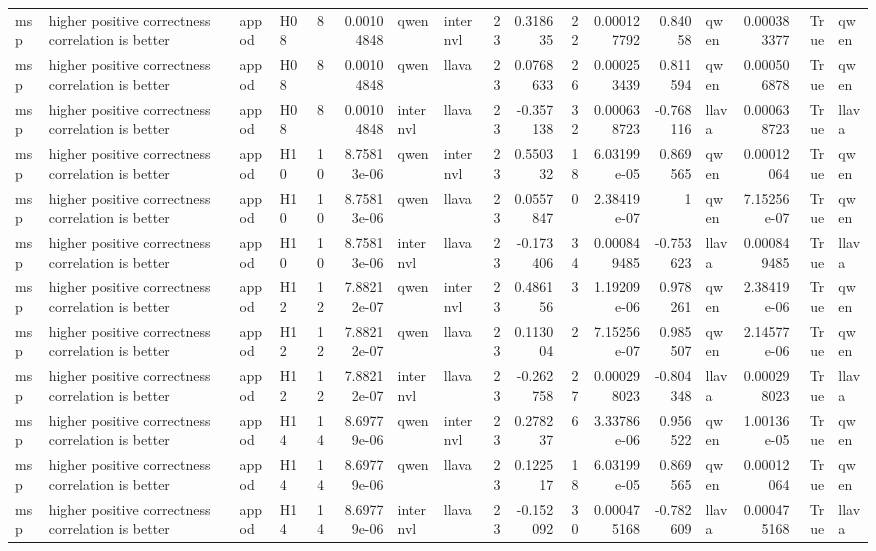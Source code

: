 \begin{longtable}{llllrrllrrrrrlrrl}
msp & higher positive correctness correlation is better & appod & H08 & 8 & 0.00104848 & qwen & internvl & 23 & 0.318635 & 22 & 0.000127792 & 0.84058 & qwen & 0.000383377 & True & qwen \\
msp & higher positive correctness correlation is better & appod & H08 & 8 & 0.00104848 & qwen & llava & 23 & 0.0768633 & 26 & 0.000253439 & 0.811594 & qwen & 0.000506878 & True & qwen \\
msp & higher positive correctness correlation is better & appod & H08 & 8 & 0.00104848 & internvl & llava & 23 & -0.357138 & 32 & 0.000638723 & -0.768116 & llava & 0.000638723 & True & llava \\
msp & higher positive correctness correlation is better & appod & H10 & 10 & 8.75813e-06 & qwen & internvl & 23 & 0.550332 & 18 & 6.03199e-05 & 0.869565 & qwen & 0.00012064 & True & qwen \\
msp & higher positive correctness correlation is better & appod & H10 & 10 & 8.75813e-06 & qwen & llava & 23 & 0.0557847 & 0 & 2.38419e-07 & 1 & qwen & 7.15256e-07 & True & qwen \\
msp & higher positive correctness correlation is better & appod & H10 & 10 & 8.75813e-06 & internvl & llava & 23 & -0.173406 & 34 & 0.000849485 & -0.753623 & llava & 0.000849485 & True & llava \\
msp & higher positive correctness correlation is better & appod & H12 & 12 & 7.88212e-07 & qwen & internvl & 23 & 0.486156 & 3 & 1.19209e-06 & 0.978261 & qwen & 2.38419e-06 & True & qwen \\
msp & higher positive correctness correlation is better & appod & H12 & 12 & 7.88212e-07 & qwen & llava & 23 & 0.113004 & 2 & 7.15256e-07 & 0.985507 & qwen & 2.14577e-06 & True & qwen \\
msp & higher positive correctness correlation is better & appod & H12 & 12 & 7.88212e-07 & internvl & llava & 23 & -0.262758 & 27 & 0.000298023 & -0.804348 & llava & 0.000298023 & True & llava \\
msp & higher positive correctness correlation is better & appod & H14 & 14 & 8.69779e-06 & qwen & internvl & 23 & 0.278237 & 6 & 3.33786e-06 & 0.956522 & qwen & 1.00136e-05 & True & qwen \\
msp & higher positive correctness correlation is better & appod & H14 & 14 & 8.69779e-06 & qwen & llava & 23 & 0.122517 & 18 & 6.03199e-05 & 0.869565 & qwen & 0.00012064 & True & qwen \\
msp & higher positive correctness correlation is better & appod & H14 & 14 & 8.69779e-06 & internvl & llava & 23 & -0.152092 & 30 & 0.000475168 & -0.782609 & llava & 0.000475168 & True & llava \\

\end{longtable}
